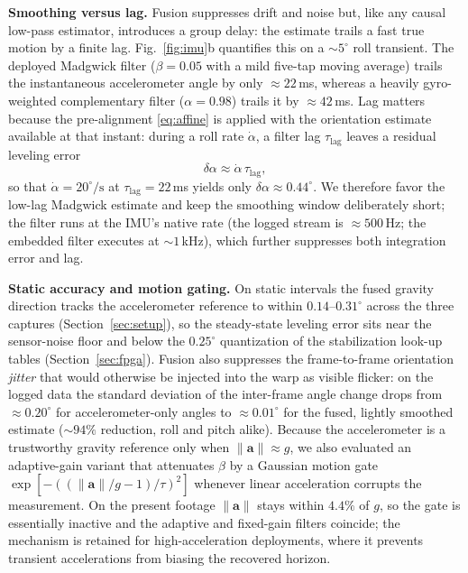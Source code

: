 \documentclass[journal]{IEEEtran}
\begin{document}
\textbf{Smoothing versus lag.} Fusion suppresses drift and noise but, like any causal low-pass estimator, introduces a group delay: the estimate trails a fast true motion by a finite lag. Fig.~\ref{fig:imu}b quantifies this on a ${\sim}5^\circ$ roll transient. The deployed Madgwick filter ($\beta=0.05$ with a mild five-tap moving average) trails the instantaneous accelerometer angle by only ${\approx}22$\,ms, whereas a heavily gyro-weighted complementary filter ($\alpha=0.98$) \cite{mahony2008complementary} trails it by ${\approx}42$\,ms. Lag matters because the pre-alignment \eqref{eq:affine} is applied with the orientation estimate available at that instant: during a roll rate $\dot\alpha$, a filter lag $\tau_{\mathrm{lag}}$ leaves a residual leveling error
\begin{equation}
\delta\alpha \approx \dot\alpha\,\tau_{\mathrm{lag}},
\label{eq:lagresid}
\end{equation}
so that $\dot\alpha=20^\circ/\mathrm{s}$ at $\tau_{\mathrm{lag}}=22$\,ms yields only $\delta\alpha\approx0.44^\circ$. We therefore favor the low-lag Madgwick estimate and keep the smoothing window deliberately short; the filter runs at the IMU's native rate (the logged stream is ${\approx}500$\,Hz; the embedded filter executes at ${\sim}1$\,kHz), which further suppresses both integration error and lag.

\textbf{Static accuracy and motion gating.} On static intervals the fused gravity direction tracks the accelerometer reference to within $0.14$--$0.31^\circ$ across the three captures (Section~\ref{sec:setup}), so the steady-state leveling error sits near the sensor-noise floor and below the $0.25^\circ$ quantization of the stabilization look-up tables (Section~\ref{sec:fpga}). Fusion also suppresses the frame-to-frame orientation \emph{jitter} that would otherwise be injected into the warp as visible flicker: on the logged data the standard deviation of the inter-frame angle change drops from ${\approx}0.20^\circ$ for accelerometer-only angles to ${\approx}0.01^\circ$ for the fused, lightly smoothed estimate ($\sim$$94\%$ reduction, roll and pitch alike). Because the accelerometer is a trustworthy gravity reference only when $\lVert\mathbf a\rVert\approx g$, we also evaluated an adaptive-gain variant that attenuates $\beta$ by a Gaussian motion gate $\exp[-((\lVert\mathbf a\rVert/g-1)/\tau)^2]$ whenever linear acceleration corrupts the measurement. On the present footage $\lVert\mathbf a\rVert$ stays within $4.4\%$ of $g$, so the gate is essentially inactive and the adaptive and fixed-gain filters coincide; the mechanism is retained for high-acceleration deployments, where it prevents transient accelerations from biasing the recovered horizon.
\end{document}
